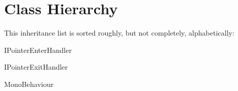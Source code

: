 \section{Class Hierarchy}
This inheritance list is sorted roughly, but not completely, alphabetically\+:\begin{DoxyCompactList}
\item I\+Pointer\+Enter\+Handler\begin{DoxyCompactList}
\item {}
\end{DoxyCompactList}
\item I\+Pointer\+Exit\+Handler\begin{DoxyCompactList}
\item {}
\end{DoxyCompactList}
\item Mono\+Behaviour\begin{DoxyCompactList}
\item {}
\item {}
\item {}
\item {}
\item {}
\end{DoxyCompactList}
\end{DoxyCompactList}
